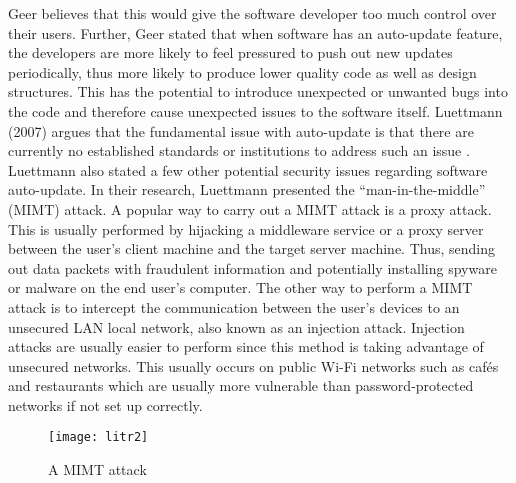 Geer believes that this would give the software developer too much control over their users. Further, Geer stated that when software has an auto-update feature, the developers are more likely to feel pressured to push out new updates periodically, thus more likely to produce lower quality code as well as design structures. This has the potential to introduce unexpected or unwanted bugs into the code and therefore cause unexpected issues to the software itself. Luettmann (2007) argues that the fundamental issue with auto-update is that there are currently no established standards or institutions to address such an issue \cite{lit9}. Luettmann also stated a few other potential security issues regarding software auto-update. In their research, Luettmann presented the “man-in-the-middle” (MIMT) attack. A popular way to carry out a MIMT attack is a proxy attack. This is usually performed by hijacking a middleware service or a proxy server between the user’s client machine and the target server machine. Thus, sending out data packets with fraudulent information and potentially installing spyware or malware on the end user’s computer. The other way to perform a MIMT attack is to intercept the communication between the user’s devices to an unsecured LAN local network, also known as an injection attack. Injection attacks are usually easier to perform since this method is taking advantage of unsecured networks. This usually occurs on public Wi-Fi networks such as cafés and restaurants which are usually more vulnerable than password-protected networks if not set up correctly.

\bigskip
\begin{figure}[hp]
\centering
\texttt{[image: litr2]}
\caption{\footnotesize{A MIMT attack \cite{lit9}}}
\captionsetup{aboveskip=0pt,font=it}
\end{figure}
\bigskip

